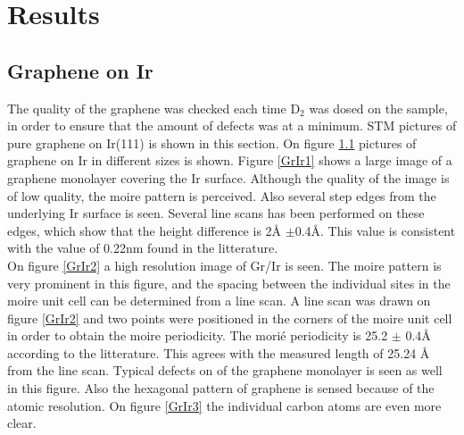 \chapter{Results}
\label{cha:results}

\section{Graphene on Ir}

The quality of the graphene was checked each time D$_2$ was dosed on the sample, in order to ensure that the amount of defects was at a minimum. STM pictures of pure graphene on Ir(111) is shown in this section. On figure \ref{GrIr} pictures of graphene on Ir in different sizes is shown. Figure \ref{GrIr1} shows a large image of a graphene monolayer covering the Ir surface. Although the quality of the image is of low quality, the moire pattern is perceived. Also several step edges from the underlying Ir surface is seen. Several line scans has been performed on these edges, which show that the height difference is 2Å $\pm$0.4Å. This value is consistent with the value of 0.22nm found in the litterature.\cite{1367-2630-11-2-023006}\\
On figure \ref{GrIr2} a high resolution image of Gr/Ir is seen. The moire pattern is very prominent in this figure, and the spacing between the individual sites in the moire unit cell can be determined from a line scan. A line scan was drawn on figure \ref{GrIr2} and two points were positioned in the corners of the moire unit cell in order to obtain the moire periodicity. The morié periodicity is 25.2 $\pm$ 0.4Å according to the litterature.\cite{1367-2630-10-4-043033} This agrees with the measured length of 25.24 Å from the line scan. Typical defects on of the graphene monolayer is seen as well in this figure. Also the hexagonal pattern of graphene is sensed because of the atomic resolution. On figure \ref{GrIr3} the individual carbon atoms are even more clear.\\

\begin{figure}[H]
\caption{}
\label{GrIr}
\end{figure}

